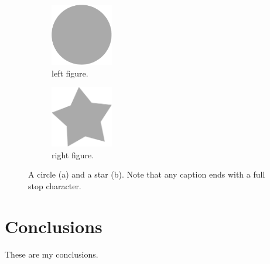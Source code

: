 \documentclass{llncs}
\begin{document}
  \begin{figure}
    \begin{subfigure}[l]{.49\textwidth}
	  \centering
      \includegraphics[width=0.3\textwidth]{template_circle.pdf}
      \caption{left figure.}
      \label{fig:circle}
	\end{subfigure}
	\hfill
    \begin{subfigure}[c]{.49\textwidth}
      \centering
      \includegraphics[width=0.3\textwidth]{template_star.pdf}
      \caption{right figure.}
      \label{fig:star}
	\end{subfigure}
    \caption{A circle (a) and a star (b). Note that any caption ends with a full stop character.}
    \label{fig:subfig}
  \end{figure}

\section{Conclusions}\label{sec:conclusions}

  These are my conclusions.

\printbibliography
\end{document}
